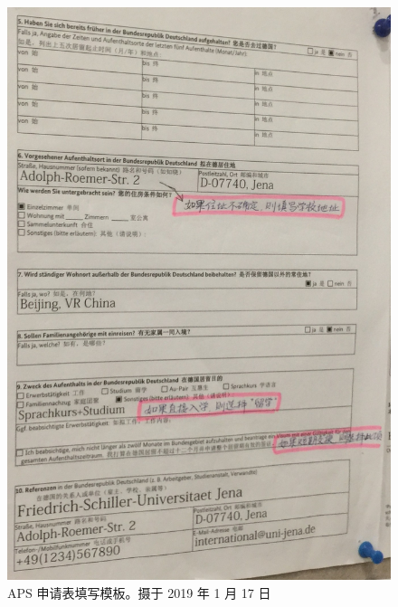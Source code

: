 \documentclass[final]{book}
\begin{document}
\begin{appendices}
\begin{figure}[htbp]
  \includegraphics[width=\textwidth]{APS-forms}
  \caption{APS 申请表填写模板。摄于 2019 年 1 月 17 日}
  \label{fig:APS-forms}
\end{figure}


\end{appendices}
\end{document}
